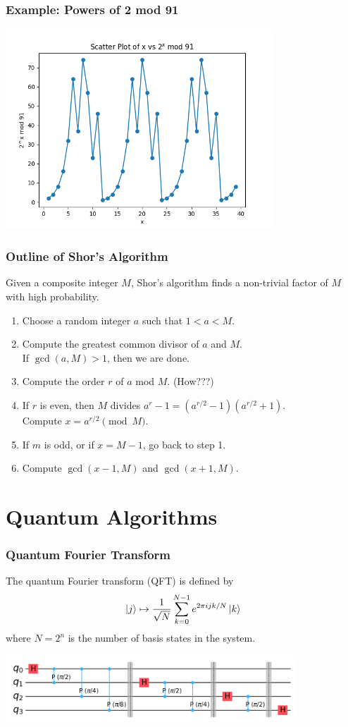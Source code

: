 \documentclass{beamer}
\begin{document}
\begin{frame}
\frametitle{Example: Powers of 2 mod 91}
\includegraphics[height=7.5cm]{mult-order.png}


\end{frame}

\begin{frame}
\frametitle{Outline of Shor's Algorithm}
Given a composite integer $M$, Shor's algorithm finds a non-trivial factor of $M$ 
with high probability.
\begin{enumerate}
    \item Choose a random integer $a$ such that $1 < a < M$.
    \item Compute the greatest common divisor of $a$ and $M$. \\ 
    If $\gcd(a, M) > 1$, then we are done.
    \item Compute the order $r$ of $a$ mod $M$. (How???)
    \item If $r$ is even, then $M$ divides
    $a^r - 1 = \left(a^{r/2} - 1\right) \left(a^{r/2} + 1 \right)$. \\
    Compute $x = a^{r/2} \pmod{M}$.
    \item If $m$ is odd, or if $x = M - 1$, go back to step 1.
    \item Compute $\gcd(x - 1, M)$ and $\gcd(x + 1, M)$.
\end{enumerate}
\end{frame}




\section{Quantum Algorithms}

\begin{frame}
    \frametitle{Quantum Fourier Transform}

    The quantum Fourier transform (QFT) is defined by
    $$\left| j \right\rangle \mapsto \frac{1}{\sqrt{N}} \sum_{k=0}^{N-1} e^{2\pi i j k / N} \left| k \right\rangle$$
    where $N = 2^n$ is the number of basis states in the system.


    \includegraphics[height=2.5cm]{qft-qiskit.png}
\end{frame}
\end{document}
